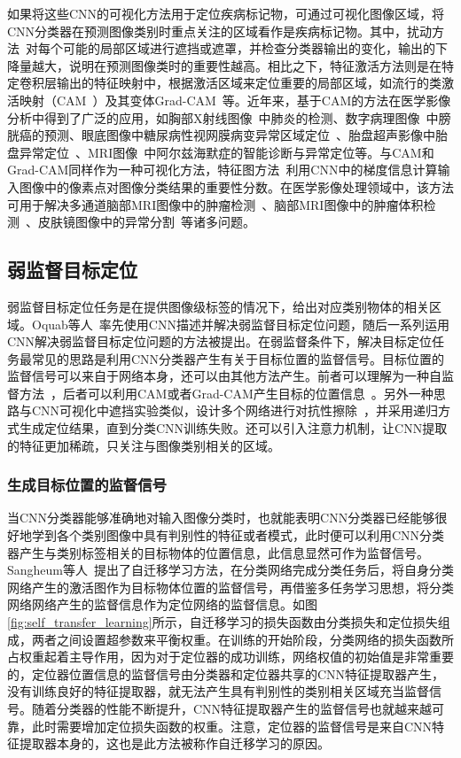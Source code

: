 如果将这些CNN的可视化方法用于定位疾病标记物，可通过可视化图像区域，将CNN分类器在预测图像类别时重点关注的区域看作是疾病标记物。其中，扰动方法~\cite{zintgraf2017visualizing}对每个可能的局部区域进行遮挡或遮罩，并检查分类器输出的变化，输出的下降量越大，说明在预测图像类时的重要性越高。相比之下，特征激活方法则是在特定卷积层输出的特征映射中，根据激活区域来定位重要的局部区域，如流行的类激活映射（CAM~\cite{zhou2016learning}）及其变体Grad-CAM~\cite{selvaraju2017grad}等。近年来，基于CAM的方法在医学影像分析中得到了广泛的应用，如胸部X射线图像~\cite{rajpurkar2017chexnet}中肺炎的检测、数字病理图像~\cite{zhang2017mdnet}中膀胱癌的预测、眼底图像中糖尿病性视网膜病变异常区域定位~\cite{Gondaletal17}、胎盘超声影像中胎盘异常定位~\cite{Qi2017WeaklySL}、MRI图像~\cite{yang2018visual}中阿尔兹海默症的智能诊断与异常定位等。与CAM和Grad-CAM同样作为一种可视化方法，特征图方法~\cite{simonyan2013deep}利用CNN中的梯度信息计算输入图像中的像素点对图像分类结果的重要性分数。在医学影像处理领域中，该方法可用于解决多通道脑部MRI图像中的肿瘤检测~\cite{banerjee2016novel}、脑部MRI图像中的肿瘤体积检测~\cite{mitra2017volumetric}、皮肤镜图像中的异常分割~\cite{jahanifar2018supervised}等诸多问题。

\subsection{弱监督目标定位}
弱监督目标定位任务是在提供图像级标签的情况下，给出对应类别物体的相关区域。Oquab等人~\cite{Oquab2015IsOL}率先使用CNN描述并解决弱监督目标定位问题，随后一系列运用CNN解决弱监督目标定位问题的方法被提出。在弱监督条件下，解决目标定位任务最常见的思路是利用CNN分类器产生有关于目标位置的监督信号。目标位置的监督信号可以来自于网络本身，还可以由其他方法产生。前者可以理解为一种自监督方法~\cite{2015Hwang}，后者可以利用CAM或者Grad-CAM产生目标的位置信息~\cite{Kim_2017_ICCV, Krishna2018}。另外一种思路与CNN可视化中遮挡实验类似，设计多个网络进行对抗性擦除~\cite{WeiFLCZY17, ZhangWF0H18}，并采用递归方式生成定位结果，直到分类CNN训练失败。还可以引入注意力机制，让CNN提取的特征更加稀疏，只关注与图像类别相关的区域。

\subsubsection*{生成目标位置的监督信号}
当CNN分类器能够准确地对输入图像分类时，也就能表明CNN分类器已经能够很好地学到各个类别图像中具有判别性的特征或者模式，此时便可以利用CNN分类器产生与类别标签相关的目标物体的位置信息，此信息显然可作为监督信号。Sangheum等人~\cite{2015Hwang}提出了自迁移学习方法，在分类网络完成分类任务后，将自身分类网络产生的激活图作为目标物体位置的监督信号，再借鉴多任务学习思想，将分类网络网络产生的监督信息作为定位网络的监督信息。如图\ref{fig:self_transfer_learning}所示，自迁移学习的损失函数由分类损失和定位损失组成，两者之间设置超参数来平衡权重。在训练的开始阶段，分类网络的损失函数所占权重起着主导作用，因为对于定位器的成功训练，网络权值的初始值是非常重要的，定位器位置信息的监督信号由分类器和定位器共享的CNN特征提取器产生，没有训练良好的特征提取器，就无法产生具有判别性的类别相关区域充当监督信号。随着分类器的性能不断提升，CNN特征提取器产生的监督信号也就越来越可靠，此时需要增加定位损失函数的权重。注意，定位器的监督信号是来自CNN特征提取器本身的，这也是此方法被称作自迁移学习的原因。

